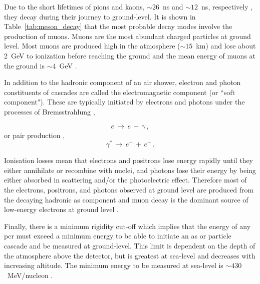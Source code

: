Due to the short lifetimes of pions and kaons, $\sim26$~ns and $\sim12$~ns, respectively \citep{particle_data_group_review_2020}, they decay during their journey to ground-level. It is shown in Table~\ref{tab:meson_decay} that the most probable decay modes involve the production of muons. Muons are the most abundant charged particles at ground level. Most muons are produced high in the atmosphere ($\sim15$~km) and lose about 2~GeV to ionization before reaching the ground and the mean energy of muons at the ground is $\sim4$~GeV \citep{particle_data_group_review_2020}.


In addition to the hadronic component of an air shower, electron and photon constituents of cascades are called the electromagnetic component (or ``soft component"). These are typically initiated by electrons and photons under the processes of Bremsstrahlung \citep{grupen_astroparticle_2005},

\begin{equation}
\label{eq:bremss}
e \, \rightarrow \, e \, + \, \gamma \, ,
\end{equation}
%
or pair production \citep{grupen_astroparticle_2005},
%
\begin{equation}
\label{eq:pair_prod}
\gamma^* \, \rightarrow \, e^- \, + \, e^+ \, .
\end{equation}

Ionisation losses mean that electrons and positrons lose energy rapidly until they either annihilate or recombine with nuclei, and photons lose their energy by being either absorbed in scattering and/or the photoelectric effect. Therefore most of the electrons, positrons,
and photons observed at ground level are produced from the decaying hadronic \gls{as} component and muon decay is the dominant source of low-energy electrons at ground level \citep{particle_data_group_review_2020}.

Finally, there is a minimum rigidity cut-off which implies that the energy of any \gls{pcr} must exceed a minimum energy to be able to initiate an \gls{as} or particle cascade and be measured at ground-level. This limit is dependent on the depth of the atmosphere above the detector, but is greatest at sea-level and decreases with increasing altitude. The minimum energy to be measured at sea-level is $\sim430$~MeV/nucleon \citep{dorman_theory_2004, dorman_experimental_2004, poluianov_gle_2017}.



